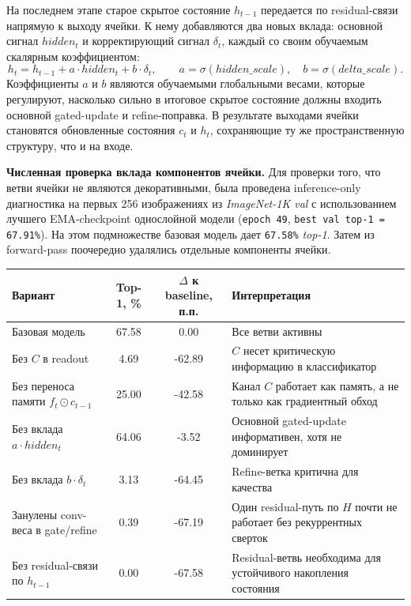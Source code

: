 \documentclass[11pt,landscape]{article}
\begin{document}
\noindent
На последнем этапе старое скрытое состояние $h_{t-1}$ передается по residual-связи напрямую к выходу ячейки. К нему добавляются два новых вклада: основной сигнал $hidden_t$ и корректирующий сигнал $\delta_t$, каждый со своим обучаемым скалярным коэффициентом:
\[
h_t = h_{t-1} + a \cdot hidden_t + b \cdot \delta_t,
\qquad
a=\sigma(hidden\_scale), \quad b=\sigma(delta\_scale).
\]
Коэффициенты $a$ и $b$ являются обучаемыми глобальными весами, которые регулируют, насколько сильно в итоговое скрытое состояние должны входить основной gated-update и refine-поправка. В результате выходами ячейки становятся обновленные состояния $c_t$ и $h_t$, сохраняющие ту же пространственную структуру, что и на входе.

\vspace{4mm}

\noindent\textbf{Численная проверка вклада компонентов ячейки.}
Для проверки того, что ветви ячейки не являются декоративными, была проведена inference-only диагностика на первых 256 изображениях из \textit{ImageNet-1K val} с использованием лучшего EMA-checkpoint однослойной модели (\texttt{epoch 49}, \texttt{best val top-1 = 67.91\%}). На этом подмножестве базовая модель дает \texttt{67.58\%} \textit{top-1}. Затем из forward-pass поочередно удалялись отдельные компоненты ячейки.

\medskip

\begin{center}
\small
\begin{tabular}{|l|c|c|l|}
\hline
\textbf{Вариант} & \textbf{Top-1, \%} & \textbf{$\Delta$ к baseline, п.п.} & \textbf{Интерпретация} \\
\hline
Базовая модель & 67.58 & 0.00 & Все ветви активны \\
\hline
Без $C$ в readout & 4.69 & -62.89 & $C$ несет критическую информацию в классификатор \\
\hline
Без переноса памяти $f_t \odot c_{t-1}$ & 25.00 & -42.58 & Канал $C$ работает как память, а не только как градиентный обход \\
\hline
Без вклада $a \cdot hidden_t$ & 64.06 & -3.52 & Основной gated-update информативен, хотя не доминирует \\
\hline
Без вклада $b \cdot \delta_t$ & 3.13 & -64.45 & Refine-ветка критична для качества \\
\hline
Занулены conv-веса в gate/refine & 0.39 & -67.19 & Один residual-путь по $H$ почти не работает без рекуррентных сверток \\
\hline
Без residual-связи по $h_{t-1}$ & 0.00 & -67.58 & Residual-ветвь необходима для устойчивого накопления состояния \\
\hline
\end{tabular}
\normalsize
\end{center}
\end{document}
